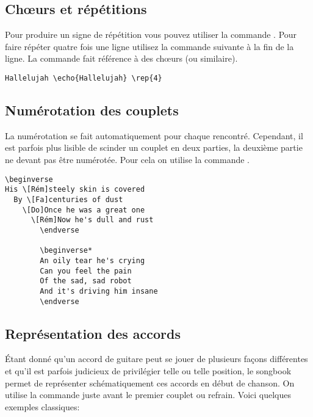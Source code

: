\documentclass[versionenligne]{patacrep}
\begin{document}
\subsection{Ch\oe{}urs et répétitions}

Pour produire un signe de répétition vous pouvez utiliser la commande
. Pour faire répéter quatre fois une ligne utilisez la
commande suivante à la fin de la ligne. La commande 
fait référence à des chœurs (ou similaire).

\begin{verbatim}
Hallelujah \echo{Hallelujah} \rep{4}
\end{verbatim}

\subsection{Numérotation des couplets}

La numérotation se fait automatiquement pour chaque 
rencontré. Cependant, il est parfois plus lisible de scinder un
couplet en deux parties, la deuxième partie ne devant pas être
numérotée. Pour cela on utilise la commande .

\begin{verbatim}
\beginverse
His \[Rém]steely skin is covered
  By \[Fa]centuries of dust
    \[Do]Once he was a great one
      \[Rém]Now he's dull and rust
        \endverse

        \beginverse*
        An oily tear he's crying
        Can you feel the pain
        Of the sad, sad robot
        And it's driving him insane
        \endverse
\end{verbatim}

\subsection{Représentation des accords}

Étant donné qu'un accord de guitare peut se jouer de plusieurs façons
différentes et qu'il est parfois judicieux de privilégier telle ou
telle position, le songbook permet de représenter schématiquement ces
accords en début de chanson. On utilise la commande 
juste avant le premier couplet ou refrain. Voici quelques exemples
classiques:
\end{document}
